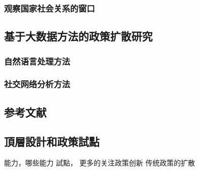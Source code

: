 \documentclass[
  12pt,
]{ctexart}
\begin{document}
\hypertarget{ux89c2ux5bdfux56fdux5bb6ux793eux4f1aux5173ux7cfbux7684ux7a97ux53e3}{%
\subsubsection{观察国家社会关系的窗口}\label{ux89c2ux5bdfux56fdux5bb6ux793eux4f1aux5173ux7cfbux7684ux7a97ux53e3}}

\hypertarget{ux57faux4e8eux5927ux6570ux636eux65b9ux6cd5ux7684ux653fux7b56ux6269ux6563ux7814ux7a76}{%
\subsection{基于大数据方法的政策扩散研究}\label{ux57faux4e8eux5927ux6570ux636eux65b9ux6cd5ux7684ux653fux7b56ux6269ux6563ux7814ux7a76}}

\hypertarget{ux81eaux7136ux8bedux8a00ux5904ux7406ux65b9ux6cd5}{%
\subsubsection{自然语言处理方法}\label{ux81eaux7136ux8bedux8a00ux5904ux7406ux65b9ux6cd5}}

\hypertarget{ux793eux4ea4ux7f51ux7edcux5206ux6790ux65b9ux6cd5}{%
\subsubsection{社交网络分析方法}\label{ux793eux4ea4ux7f51ux7edcux5206ux6790ux65b9ux6cd5}}

\hypertarget{ux53c2ux8003ux6587ux732e}{%
\subsection{参考文献}\label{ux53c2ux8003ux6587ux732e}}

\hypertarget{ux9802ux5c64ux8a2dux8a08ux548cux653fux7b56ux8a66ux9ede}{%
\subsection{頂層設計和政策試點}\label{ux9802ux5c64ux8a2dux8a08ux548cux653fux7b56ux8a66ux9ede}}

能力，哪些能力
試點，
更多的关注政策创新
传统政策的扩散
\end{document}
